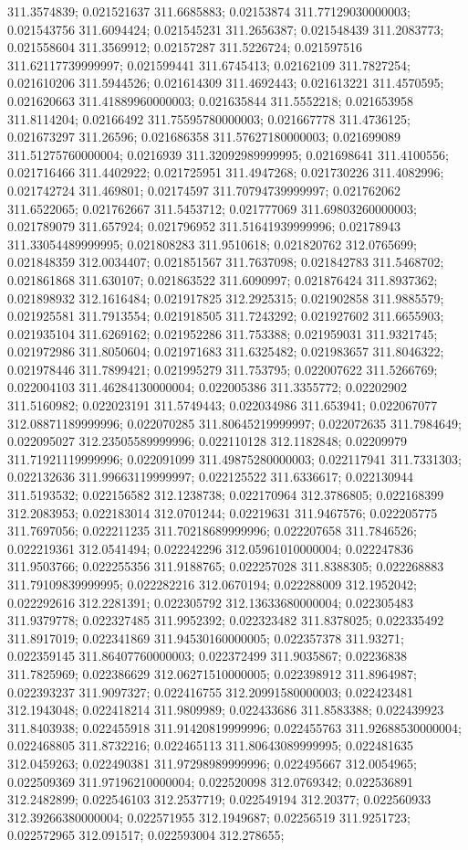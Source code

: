 311.3574839; 0.021521637 311.6685883; 0.02153874 311.77129030000003; 0.021543756 311.6094424; 0.021545231 311.2656387; 0.021548439 311.2083773; 0.021558604 311.3569912; 0.02157287 311.5226724; 0.021597516 311.62117739999997; 0.021599441 311.6745413; 0.02162109 311.7827254; 0.021610206 311.5944526; 0.021614309 311.4692443; 0.021613221 311.4570595; 0.021620663 311.41889960000003; 0.021635844 311.5552218; 0.021653958 311.8114204; 0.02166492 311.75595780000003; 0.021667778 311.4736125; 0.021673297 311.26596; 0.021686358 311.57627180000003; 0.021699089 311.51275760000004; 0.0216939 311.32092989999995; 0.021698641 311.4100556; 0.021716466 311.4402922; 0.021725951 311.4947268; 0.021730226 311.4082996; 0.021742724 311.469801; 0.02174597 311.70794739999997; 0.021762062 311.6522065; 0.021762667 311.5453712; 0.021777069 311.69803260000003; 0.021789079 311.657924; 0.021796952 311.51641939999996; 0.02178943 311.33054489999995; 0.021808283 311.9510618; 0.021820762 312.0765699; 0.021848359 312.0034407; 0.021851567 311.7637098; 0.021842783 311.5468702; 0.021861868 311.630107; 0.021863522 311.6090997; 0.021876424 311.8937362; 0.021898932 312.1616484; 0.021917825 312.2925315; 0.021902858 311.9885579; 0.021925581 311.7913554; 0.021918505 311.7243292; 0.021927602 311.6655903; 0.021935104 311.6269162; 0.021952286 311.753388; 0.021959031 311.9321745; 0.021972986 311.8050604; 0.021971683 311.6325482; 0.021983657 311.8046322; 0.021978446 311.7899421; 0.021995279 311.753795; 0.022007622 311.5266769; 0.022004103 311.46284130000004; 0.022005386 311.3355772; 0.02202902 311.5160982; 0.022023191 311.5749443; 0.022034986 311.653941; 0.022067077 312.08871189999996; 0.022070285 311.80645219999997; 0.022072635 311.7984649; 0.022095027 312.23505589999996; 0.022110128 312.1182848; 0.02209979 311.71921119999996; 0.022091099 311.49875280000003; 0.022117941 311.7331303; 0.022132636 311.99663119999997; 0.022125522 311.6336617; 0.022130944 311.5193532; 0.022156582 312.1238738; 0.022170964 312.3786805; 0.022168399 312.2083953; 0.022183014 312.0701244; 0.02219631 311.9467576; 0.022205775 311.7697056; 0.022211235 311.70218689999996; 0.022207658 311.7846526; 0.022219361 312.0541494; 0.022242296 312.05961010000004; 0.022247836 311.9503766; 0.022255356 311.9188765; 0.022257028 311.8388305; 0.022268883 311.79109839999995; 0.022282216 312.0670194; 0.022288009 312.1952042; 0.022292616 312.2281391; 0.022305792 312.13633680000004; 0.022305483 311.9379778; 0.022327485 311.9952392; 0.022323482 311.8378025; 0.022335492 311.8917019; 0.022341869 311.94530160000005; 0.022357378 311.93271; 0.022359145 311.86407760000003; 0.022372499 311.9035867; 0.02236838 311.7825969; 0.022386629 312.06271510000005; 0.022398912 311.8964987; 0.022393237 311.9097327; 0.022416755 312.20991580000003; 0.022423481 312.1943048; 0.022418214 311.9809989; 0.022433686 311.8583388; 0.022439923 311.8403938; 0.022455918 311.91420819999996; 0.022455763 311.92688530000004; 0.022468805 311.8732216; 0.022465113 311.80643089999995; 0.022481635 312.0459263; 0.022490381 311.97298989999996; 0.022495667 312.0054965; 0.022509369 311.97196210000004; 0.022520098 312.0769342; 0.022536891 312.2482899; 0.022546103 312.2537719; 0.022549194 312.20377; 0.022560933 312.39266380000004; 0.022571955 312.1949687; 0.02256519 311.9251723; 0.022572965 312.091517; 0.022593004 312.278655; 